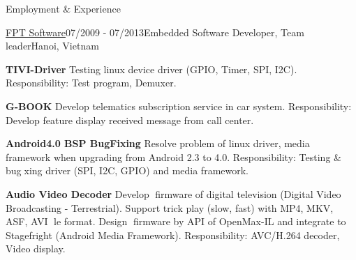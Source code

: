 \documentclass{resume}
\begin{document}
\begin{rSection}{Employment \& Experience}
    \begin{rSubsection}{\underline{FPT Software}}{07/2009 - 07/2013}{Embedded Software Developer, Team leader}{Hanoi, Vietnam}
    \item \textbf{TIVI-Driver} Testing linux device driver (GPIO, Timer, SPI, I2C).
    \newline Responsibility: Test program, Demuxer.
    \item \textbf{G-BOOK} Develop telematics subscription service in car system.
    \newline Responsibility: Develop feature display received message from call center.
    \item \textbf{Android4.0 BSP BugFixing} Resolve problem of linux driver, media framework when upgrading from Android 2.3 to 4.0.
    \newline Responsibility: Testing \& bugxing driver (SPI, I2C, GPIO) and media framework. 
    \item \textbf{Audio Video Decoder} Develop firmware of digital television (Digital Video Broadcasting - Terrestrial). Support trick play (slow, fast) with MP4, MKV, ASF, AVI le format. Design firmware by API of OpenMax-IL and integrate to Stagefright (Android Media Framework).
    \newline Responsibility: AVC/H.264 decoder, Video display.
    \end{rSubsection}
  
  \end{rSection}
  
\end{document}
